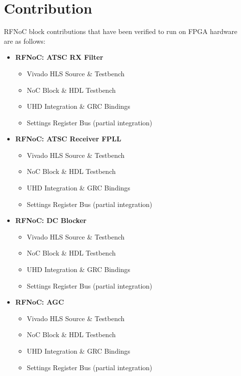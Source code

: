\documentclass{article}
\begin{document}
\section{Contribution} \label{contribution}

RFNoC block contributions that have been verified to run on FPGA hardware are as follows: 

\begin{itemize}
\item \textbf{RFNoC: ATSC RX Filter}
	\begin{itemize}
	\item Vivado HLS Source \& Testbench
	\item NoC Block \& HDL Testbench
	\item UHD Integration \& GRC Bindings
	\item Settings Register Bus (partial 	integration)
	\end{itemize}

\item \textbf{RFNoC: ATSC Receiver FPLL}
	\begin{itemize}
	\item Vivado HLS Source \& Testbench
	\item NoC Block \& HDL Testbench
	\item UHD Integration \& GRC Bindings
	\item Settings Register Bus (partial 	integration)
	\end{itemize}

\item \textbf{RFNoC: DC Blocker}
	\begin{itemize}
	\item Vivado HLS Source \& Testbench
	\item NoC Block \& HDL Testbench
	\item UHD Integration \& GRC Bindings
	\item Settings Register Bus (partial 	integration)
	\end{itemize}

\item \textbf{RFNoC: AGC}
	\begin{itemize}
	\item Vivado HLS Source \& Testbench
	\item NoC Block \& HDL Testbench
	\item UHD Integration \& GRC Bindings
	\item Settings Register Bus (partial 	integration)
	\end{itemize}


\end{itemize}
\end{document}
